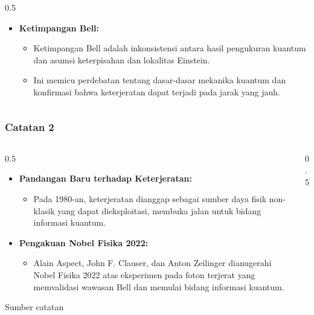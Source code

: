 \begin{frame}
\begin{columns}
\begin{column}{0.5\textwidth}
\begin{itemize}
                \item \textbf{Ketimpangan Bell:}
                    \begin{itemize} \justifying \tiny 
                        \item Ketimpangan Bell adalah inkonsistensi antara hasil pengukuran kuantum dan asumsi keterpisahan dan lokalitas Einstein.
                        \item Ini memicu perdebatan tentang dasar-dasar mekanika kuantum dan konfirmasi bahwa keterjeratan dapat terjadi pada jarak yang jauh.
                    \end{itemize}
                \end{itemize}
            \end{column}
    \end{columns}
\end{frame}

\begin{frame}
\frametitle{Catatan 2}

    \begin{columns} %
        \begin{column}{0.5\textwidth}
        \justifying %
        \tiny %
            \begin{itemize}
                \item \textbf{Pandangan Baru terhadap Keterjeratan:}
                    \begin{itemize} \justifying \tiny \justifying \tiny 
                        \item Pada 1980-an, keterjeratan dianggap sebagai sumber daya fisik non-klasik yang dapat dieksploitasi, membuka jalan untuk bidang informasi kuantum.
                \end{itemize}
                \item \textbf{Pengakuan Nobel Fisika 2022:}
                    \begin{itemize} \justifying \tiny 
                        \item Alain Aspect, John F. Clauser, dan Anton Zeilinger dianugerahi Nobel Fisika 2022 atas eksperimen pada foton terjerat yang memvalidasi wawasan Bell dan memulai bidang informasi kuantum.
                \end{itemize}            
            \end{itemize} 
           Sumber catatan 
        \end{column}
        
        \begin{column}{0.5\textwidth} %
        \end{column}
    \end{columns}
\end{frame}


